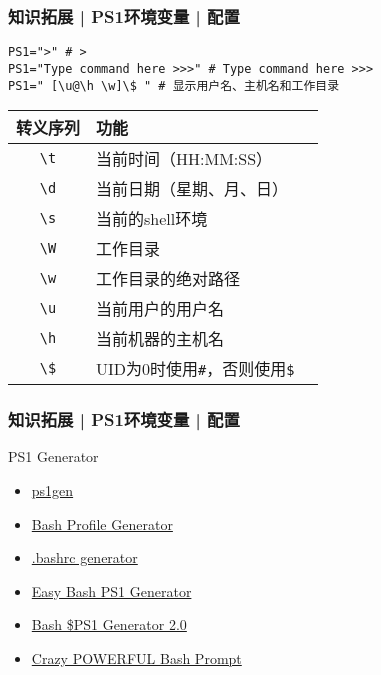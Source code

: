 \begin{frame}[fragile]
  \frametitle{知识拓展 | PS1环境变量 | 配置}
  \vspace{-1.5em}
\begin{lstlisting}
PS1=">" # >
PS1="Type command here >>>" # Type command here >>>
PS1=" [\u@\h \w]\$ " # 显示用户名、主机名和工作目录
\end{lstlisting}
  \pause
  \begin{table}
    \centering
    \begin{tabularx}{\textwidth}{cXX}
      \hline
      \rowcolor{blue!50}转义序列 & 功能\\
      \hline
      \verb|\t| & 当前时间（HH:MM:SS）\\
      \verb|\d| & 当前日期（星期、月、日）\\
      \verb|\s| & 当前的shell环境\\
      \verb|\W| & 工作目录\\
      \verb|\w| & 工作目录的绝对路径\\
      \verb|\u| & 当前用户的用户名\\
      \verb|\h| & 当前机器的主机名\\
      \verb|\$| & UID为0时使用\verb|#|，否则使用\verb|$|\\
      \hline
    \end{tabularx}
  \end{table}
\end{frame}

\begin{frame}
  \frametitle{知识拓展 | PS1环境变量 | 配置}
  \begin{block}{PS1 Generator}
    \begin{itemize}
      \item \href{http://omar.io/ps1gen/}{ps1gen}
      \item \href{https://xta.github.io/HalloweenBash/}{Bash Profile Generator}
      \item \href{http://bashrcgenerator.com/}{.bashrc generator}
      \item \href{http://ezprompt.net/}{Easy Bash PS1 Generator}
      \item \href{https://www.kirsle.net/wizards/ps1.html}{Bash \$PS1 Generator 2.0}
      \item \href{https://www.askapache.com/linux/bash-power-prompt/}{Crazy POWERFUL Bash Prompt}
    \end{itemize}
  \end{block}
\end{frame}

